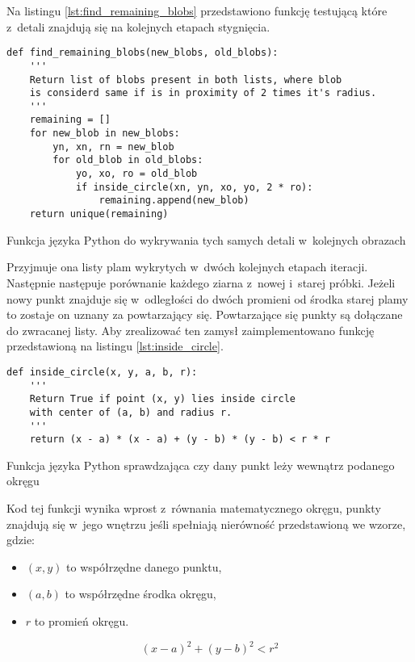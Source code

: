 Na listingu \ref{lst:find_remaining_blobs} przedstawiono funkcję testującą
które z~detali znajdują się na kolejnych etapach stygnięcia.
\begin{listing}[htbp]
\begin{verbatim}
def find_remaining_blobs(new_blobs, old_blobs):
    '''
    Return list of blobs present in both lists, where blob
    is considerd same if is in proximity of 2 times it's radius.
    '''
    remaining = []
    for new_blob in new_blobs:
        yn, xn, rn = new_blob
        for old_blob in old_blobs:
            yo, xo, ro = old_blob
            if inside_circle(xn, yn, xo, yo, 2 * ro):
                remaining.append(new_blob)
    return unique(remaining)
\end{verbatim}
\caption{Funkcja języka Python do wykrywania tych samych detali w~kolejnych
         obrazach}
\label{lst:find_remaining_blobs}
\end{listing}
Przyjmuje ona listy plam wykrytych w~dwóch kolejnych etapach iteracji.
Następnie następuje porównanie każdego ziarna z~nowej i~starej próbki.
Jeżeli nowy punkt znajduje się w~odległości do dwóch promieni od środka
starej plamy to zostaje on uznany za powtarzający się.
Powtarzające się punkty są dołączane do zwracanej listy.
Aby zrealizować ten zamysł zaimplementowano funkcję przedstawioną na listingu
\ref{lst:inside_circle}.
\begin{listing}[htbp]
\begin{verbatim}
def inside_circle(x, y, a, b, r):
    '''
    Return True if point (x, y) lies inside circle 
    with center of (a, b) and radius r.
    '''
    return (x - a) * (x - a) + (y - b) * (y - b) < r * r
\end{verbatim}
\caption{Funkcja języka Python sprawdzająca czy dany punkt leży wewnątrz
         podanego okręgu}
\label{lst:inside_circle}
\end{listing}
Kod tej funkcji wynika wprost z~równania matematycznego okręgu, punkty
znajdują się w~jego wnętrzu jeśli spełniają nierówność przedstawioną we
wzorze, gdzie:
\begin{itemize}
	\item $ \left( x, y \right) $ to współrzędne danego punktu,
	\item $ \left( a, b \right) $ to współrzędne środka okręgu,
	\item $ r $ to promień okręgu.
\end{itemize}
\begin{equation}
\left( x - a \right) ^2 + \left( y - b \right )^2 < r^2
\label{eq:circle}	
\end{equation}
